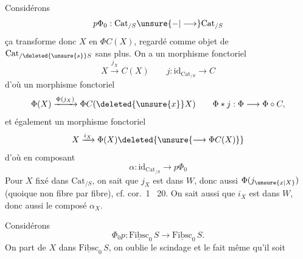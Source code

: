 Considérons
\[
 p\Phi_0:\mathrm{Cat}_{/S}\unsure{\mathord{-}|\longrightarrow}\mathrm{Cat}_{/S}
\]
ça transforme donc $X$ en $\Phi C(X)$, regardé comme objet de $\mathrm{Cat}_{/\deleted{\unsure{s}}S}$ sans plus. On a un morphisme fonctoriel
\[
 X\xrightarrow{j_X} C(X)\qquad j:\mathrm{id}_{\mathrm{Cat}_{/S}}\longrightarrow C
\]
d'où un morphisme fonctoriel
\[
 \Phi(X)\xrightarrow{\Phi(j_X)}\Phi C(\deleted{\unsure{x}}X)\qquad
 \Phi*j:\Phi\longrightarrow\Phi\circ C,
\]
et également un morphisme fonctoriel
\[
 X\xrightarrow{i_X}\Phi(X)\deleted{\unsure{\longrightarrow\Phi C(X)}}
\]
d'où en composant
\[
 \alpha:\mathrm{id}_{\mathrm{Cat}_{/S}}\longrightarrow p\Phi_0
\]
Pour $X$ fixé dans $\mathrm{Cat}_{/S}$, on sait que $j_X$ est dans $W$, donc aussi $\Phi(j_{\unsure{x|X}})$ (quoique non fibre par fibre), cf. cor.~1 ~20. On sait aussi que $i_X$ est dans $W$, donc aussi  le composé $\alpha_X$.

Considérons
\[
 \Phi_0 p:\underline{\mathrm{Fibsc}}_0\,S\longrightarrow\underline{\mathrm{Fibsc}}_0\,S.
\]
On part de $X$ dans $\underline{\mathrm{Fibsc}}_0\,S$, on oublie le scindage et le fait même qu'il soit 
